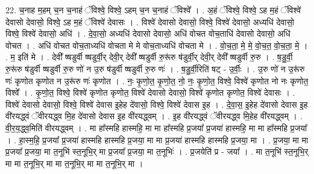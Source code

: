 \documentclass[17pt]{extarticle}
\begin{document}
22. च॒नाह म॒हम् च॒न च॒नाहं ॅविश्वे॒ विश्वे॒ ऽहम् च॒न च॒नाहं ॅविश्वे᳚ । . अ॒हं ॅविश्वे॒ विश्वे॒ ऽह म॒हं ॅविश्वे॑ देवासो देवासो॒ विश्वे॒ ऽह म॒हं ॅविश्वे॑ देवासः । . विश्वे॑ देवासो देवासो॒ विश्वे॒ विश्वे॑ देवासो॒ अध्यधि॑ देवासो॒ विश्वे॒ विश्वे॑ देवासो॒ अधि॑ । . दे॒वा॒सो॒ अध्यधि॑ देवासो देवासो॒ अधि॑ वोचत वोच॒ताधि॑ देवासो देवासो॒ अधि॑ वोचत । . अधि॑ वोचत वोच॒ताध्यधि॑ वोचता मे मे वोच॒ताध्यधि॑ वोचता मे । . वो॒च॒ता॒ मे॒ मे॒ वो॒च॒त॒ वो॒च॒ता॒ मे॒ । . म॒ इति॑ मे । . देवी᳚ ष्षडुर्वी ष्षडुर्वी॒र् देवी॒र् देवी᳚ ष्षडुर्वी रु॒रू॑रु ष॑डुर्वी॒र् देवी॒र् देवी᳚ ष्षडुर्वी रु॒रु । . ष॒डु॒र्वी॒ रु॒रू॑रु ष॑डुर्वी ष्षडुर्वी रु॒रु णो॑ न उ॒रु ष॑डुर्वी ष्षडुर्वी रु॒रु णः॑ । . ष॒डु॒र्वी॒रिति॑ षट् - उ॒र्वीः॒ । . उ॒रु णो॑ न उ॒रू॑रु णः॑ कृणोत कृणोत न उ॒रू॑रु णः॑ कृणोत । . नः॒ कृ॒णो॒त॒ कृ॒णो॒त॒ नो॒ नः॒ कृ॒णो॒त॒ विश्वे॒ विश्वे॑ कृणोत नो नः कृणोत॒ विश्वे᳚ । . कृ॒णो॒त॒ विश्वे॒ विश्वे॑ कृणोत कृणोत॒ विश्वे॑ देवासो देवासो॒ विश्वे॑ कृणोत कृणोत॒ विश्वे॑ देवासः । . विश्वे॑ देवासो देवासो॒ विश्वे॒ विश्वे॑ देवास इ॒हेह दे॑वासो॒ विश्वे॒ विश्वे॑ देवास इ॒ह । . दे॒वा॒स॒ इ॒हेह दे॑वासो देवास इ॒ह वी॑रयद्ध्वं ॅवीरयद्ध्व मि॒ह दे॑वासो देवास इ॒ह वी॑रयद्ध्वम् । . इ॒ह वी॑रयद्ध्वं ॅवीरयद्ध्व मि॒हेह वी॑रयद्ध्वम् । . वी॒र॒य॒द्ध्व॒मिति॑ वीरयद्ध्वम् । . मा हा᳚स्महि हास्महि॒ मा मा हा᳚स्महि प्र॒जया᳚ प्र॒जया॑ हास्महि॒ मा मा हा᳚स्महि प्र॒जया᳚ । . हा॒स्म॒हि॒ प्र॒जया᳚ प्र॒जया॑ हास्महि हास्महि प्र॒जया॒ मा मा प्र॒जया॑ हास्महि हास्महि प्र॒जया॒ मा । . प्र॒जया॒ मा मा प्र॒जया᳚ प्र॒जया॒ मा त॒नूभि॑ स्त॒नूभि॒र् मा प्र॒जया᳚ प्र॒जया॒ मा त॒नूभिः॑ । . प्र॒जयेति॑ प्र - जया᳚ । . मा त॒नूभि॑ स्त॒नूभि॒र् मा मा त॒नूभि॒र् मा मा त॒नूभि॒र् मा मा त॒नूभि॒र् मा । \newline
\end{document}

